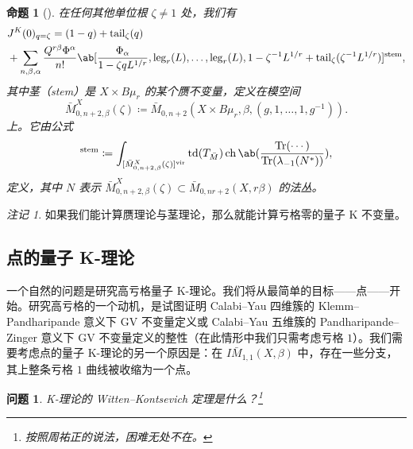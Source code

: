 \documentclass{amsart}
\newtheorem{prop}[thm]{命题}
\newtheorem{quest}[thm]{问题}
\theoremstyle{definition}
\theoremstyle{remark}
\newtheorem{rmk}[thm]{注记}
\theoremstyle{plain}
\theoremstyle{definition}
\theoremstyle{remark}
\newcommand{\mr}[1]{\mathrm{#1}}
\newcommand{\on}[1]{\operatorname{#1}}
\newcommand{\1}{\mathbf{1}}
\newcommand{\2}{\mathbf{2}}
\newcommand{\3}{\mathbf{3}}
\newcommand{\vir}{\mr{vir}}
\begin{document}
\begin{prop}[{\cite{GiventalTonita2014}}]
    在任何其他单位根 \(\zeta \neq 1\) 处，我们有
    \begin{align*}
        &J^K(0)_{q = \zeta} = (1-q) + \mr{tail}_{\zeta}(q) \\
        &+ \sum_{n,\beta,\alpha} \frac{Q^{r\beta}\Phi^{\alpha}}{n!} \ab[\frac{\Phi_{\alpha}}{1-\zeta q L^{1/r}}, \mr{leg}_r(L), \ldots, \mr{leg}_r(L), 1 - \zeta^{-1}L^{1/r} + \mr{tail}_{\zeta}(\zeta^{-1} L^{1/r})]^{\mr{stem}},
    \end{align*}
    其中茎（stem）是 \(X \times B\mu_r\) 的某个赝不变量，定义在模空间
    \[ \bar{M}_{0,n+2,\beta}^X(\zeta) \coloneqq \bar{M}_{0,n+2}(X \times B\mu_r, \beta, (g, 1, \ldots, 1, g^{-1})). \]
    上。它由公式
    \begin{align*}
        [\cdots]^{\mr{stem}} \coloneqq \int_{[\bar{M}_{0,n+2,\beta}^X(\zeta)]^{\vir}} \on{td}(T_{\bar{M}}) \on{ch}\ab(\frac{\on{Tr}(\cdots)}{\on{Tr}(\lambda_{-1}(N^*))}), 
    \end{align*}
    定义，其中 \(N\) 表示 \(\bar{M}_{0,n+2,\beta}^X(\zeta) \subset \bar{M}_{0,nr+2}(X, r\beta)\) 的法丛。
\end{prop}

\begin{rmk}
    如果我们能计算赝理论与茎理论，那么就能计算亏格零的量子 K 不变量。
\end{rmk}

\subsection{点的量子 K-理论}%
\label{sub:Quantum K-theory of a point}

一个自然的问题是研究高亏格量子 K-理论。我们将从最简单的目标——点——开始。研究高亏格的一个动机，是试图证明 Calabi–Yau 四维簇的 Klemm–Pandharipande 意义下 GV 不变量定义或 Calabi–Yau 五维簇的 Pandharipande–Zinger 意义下 GV 不变量定义的整性（在此情形中我们只需考虑亏格 \(1\)）。我们需要考虑点的量子 K-理论的另一个原因是：在 \(I\bar{M}_{1,1}(X, \beta)\) 中，存在一些分支，其上整条亏格 \(1\) 曲线被收缩为一个点。

\begin{quest}
    K-理论的 Witten–Kontsevich 定理是什么？\footnote{按照周祐正的说法，困难无处不在。}
\end{quest}
\end{document}
